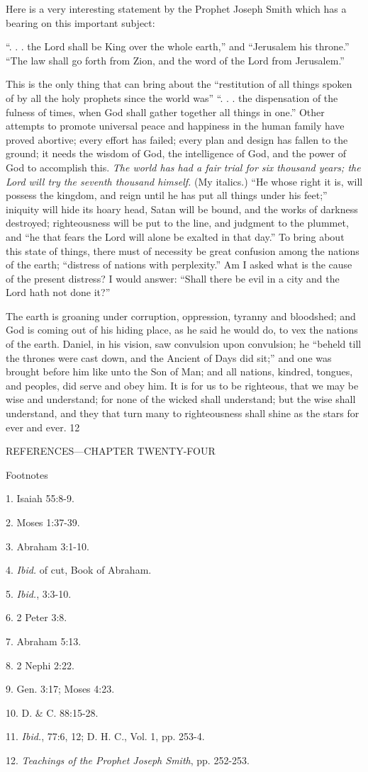 Here is a very interesting statement by the Prophet Joseph Smith which has a bearing on this
important subject:

``. . . the Lord shall be King over the whole earth,'' and ``Jerusalem his throne.'' ``The law shall
go forth from Zion, and the word of the Lord from Jerusalem.''

This is the only thing that can bring about the ``restitution of all things spoken of by all the
holy prophets since the world was'' ``. . . the dispensation of the fulness of times, when God
shall gather together all things in one.'' Other attempts to promote universal peace and
happiness in the human family have proved abortive; every effort has failed; every plan and
design has fallen to the ground; it needs the wisdom of God, the intelligence of God, and the
power of God to accomplish this. \textit{The world has had a fair trial for six thousand years; the
Lord will try the seventh thousand himself.} (My italics.) ``He whose right it is, will possess
the kingdom, and reign until he has put all things under his feet;'' iniquity will hide its hoary
head, Satan will be bound, and the works of darkness destroyed; righteousness will be put to
the line, and judgment to the plummet, and ``he that fears the Lord will alone be exalted in
that day.'' To bring about this state of things, there must of necessity be great confusion
among the nations of the earth; ``distress of nations with perplexity.'' Am I asked what is the
cause of the present distress? I would answer: ``Shall there be evil in a city and the Lord hath
not done it?''

The earth is groaning under corruption, oppression, tyranny and bloodshed; and God is
coming out of his hiding place, as he said he would do, to vex the nations of the earth.
Daniel, in his vision, saw convulsion upon convulsion; he ``beheld till the thrones were cast
down, and the Ancient of Days did sit;'' and one was brought before him like unto the Son of
Man; and all nations, kindred, tongues, and peoples, did serve and obey him. It is for us to be
righteous, that we may be wise and understand; for none of the wicked shall understand; but
the wise shall understand, and they that turn many to righteousness shall shine as the stars for
ever and ever. 12

\newpage
REFERENCES—CHAPTER TWENTY-FOUR

Footnotes

1. Isaiah 55:8-9.

2. Moses 1:37-39.

3. Abraham 3:1-10.

4. \textit{Ibid.} of cut, Book of Abraham.

5. \textit{Ibid.}, 3:3-10.

6. 2 Peter 3:8.

7. Abraham 5:13.

8. 2 Nephi 2:22.

9. Gen. 3:17; Moses 4:23.

10. D. \& C. 88:15-28.

11. \textit{Ibid.}, 77:6, 12; D. H. C., Vol. 1, pp. 253-4.

12. \textit{Teachings of the Prophet Joseph Smith}, pp. 252-253.

